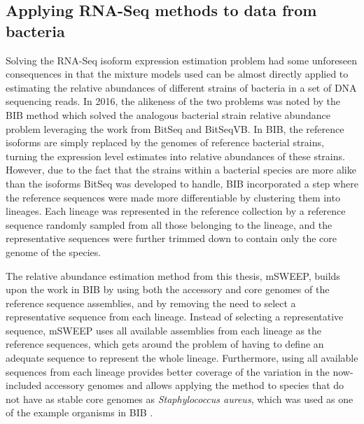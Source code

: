 \documentclass[officiallayout]{tktla}
\begin{document}
\subsection{Applying RNA-Seq methods to data from bacteria}

Solving the RNA-Seq isoform expression estimation problem had some
unforeseen consequences in that the mixture models used can be almost
directly applied to estimating the relative abundances of different
strains of bacteria in a set of DNA sequencing reads. In 2016, the
alikeness of the two problems was noted by the BIB method
\citep{sankar2016bayesian} which solved the analogous bacterial strain
relative abundance problem leveraging the work from BitSeq and
BitSeqVB. In BIB, the reference isoforms are simply replaced by the
genomes of reference bacterial strains, turning the expression level
estimates into relative abundances of these strains. However, due to
the fact that the strains within a bacterial species are more alike
than the isoforms BitSeq was developed to handle, BIB incorporated a
step where the reference sequences were made more differentiable by
clustering them into lineages. Each lineage was represented in the
reference collection by a reference sequence randomly sampled from all
those belonging to the lineage, and the representative sequences were
further trimmed down to contain only the core genome of the species.

The relative abundance estimation method from this thesis, mSWEEP,
builds upon the work in BIB by using both the accessory and core
genomes of the reference sequence assemblies, and by removing the need
to select a representative sequence from each lineage. Instead of
selecting a representative sequence, mSWEEP uses all available
assemblies from each lineage as the reference sequences, which gets
around the problem of having to define an adequate sequence to
represent the whole lineage. Furthermore, using all available
sequences from each lineage provides better coverage of the variation
in the now-included accessory genomes and allows applying the method
to species that do not have as stable core genomes as
\textit{Staphylococcus aureus}, which was used as one of the example
organisms in BIB \citep{sankar2016bayesian}.
\end{document}
